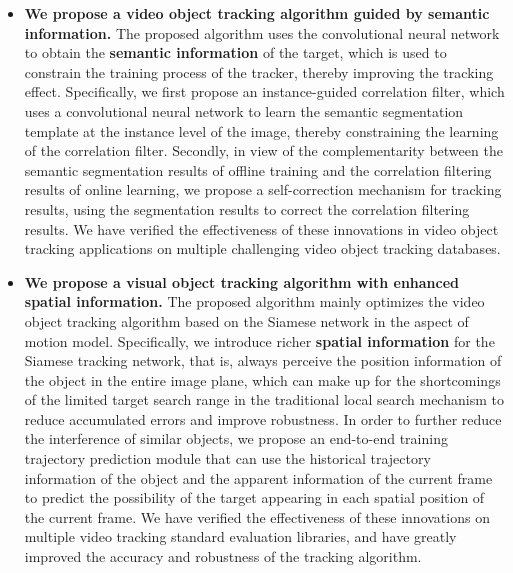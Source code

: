 \begin{itemize}
\item{\textbf{We propose a video object tracking algorithm guided by semantic information.} The proposed algorithm uses the convolutional neural network to obtain the \textbf{semantic information} of the target, which is used to constrain the training process of the tracker, thereby improving the tracking effect. Specifically, we first propose an instance-guided correlation filter, which uses a convolutional neural network to learn the semantic segmentation template at the instance level of the image, thereby constraining the learning of the correlation filter. Secondly, in view of the complementarity between the semantic segmentation results of offline training and the correlation filtering results of online learning, we propose a self-correction mechanism for tracking results, using the segmentation results to correct the correlation filtering results. We have verified the effectiveness of these innovations in video object tracking applications on multiple challenging video object tracking databases.}

\item{\textbf{We propose a visual object tracking algorithm with enhanced spatial information.} The proposed algorithm mainly optimizes the video object tracking algorithm based on the Siamese network in the aspect of motion model. Specifically, we introduce richer \textbf{spatial information} for the Siamese tracking network, that is, always perceive the position information of the object in the entire image plane, which can make up for the shortcomings of the limited target search range in the traditional local search mechanism to reduce accumulated errors and improve robustness. In order to further reduce the interference of similar objects, we propose an end-to-end training trajectory prediction module that can use the historical trajectory information of the object and the apparent information of the current frame to predict the possibility of the target appearing in each spatial position of the current frame. We have verified the effectiveness of these innovations on multiple video tracking standard evaluation libraries, and have greatly improved the accuracy and robustness of the tracking algorithm.}


\end{itemize}
